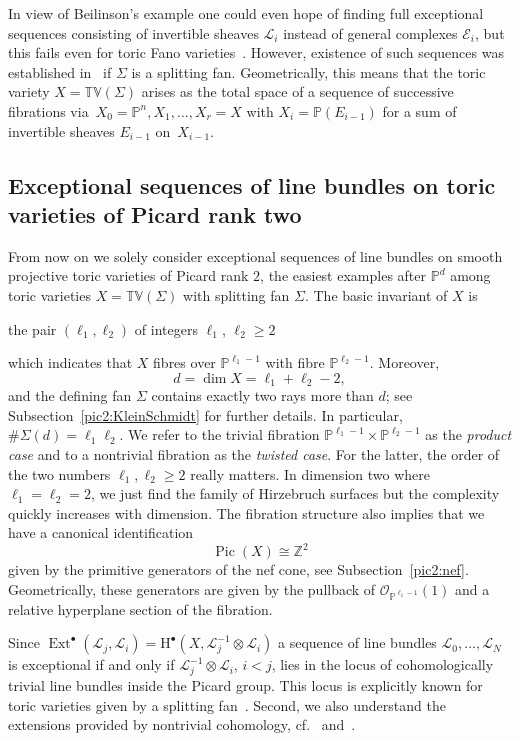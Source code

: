 \documentclass[11pt]{article}
\theoremstyle{definition}
\numberwithin{equation}{section}
\newcommand{\PP}{\mathbb P}
\newcommand{\T}{\mathbb T}
\newcommand{\V}{\mathbb V}
\newcommand{\Z}{\mathbb Z}
\newcommand{\CE}{{\mathcal E}}
\newcommand{\CL}{{\mathcal L}}
\newcommand{\CO}{{\mathcal O}}
\newcommand{\toric}{\T\V}
\newcommand{\Pic}{\operatorname{Pic}}
\newcommand{\gExt}{\operatorname{Ext}}
\newcommand{\kss}{\scriptscriptstyle}
\newcommand{\kbb}{{\kss \bullet}}
\renewcommand{\sharp}{\#}
\newcommand{\ssect}[1]{Subsection~\ref{#1}}
\begin{document}
In view of Beilinson's example one could even 
hope of finding full exceptional sequences 
consisting of invertible sheaves 
$\CL_i$ instead of general complexes $\CE_i$, 
but this fails even for toric Fano 
varieties~\cite{efimov}. However, 
existence of such sequences was established 
in~\cite{CostaMiroRoig} if $\Sigma$ is a 
splitting fan. Geometrically, this means that the 
toric variety $X=\toric(\Sigma)$ arises as the 
total space of a sequence of successive fibrations 
via~$X_0=\PP^n,X_1,\ldots,X_r=X$ with 
$X_i=\PP(E_{i-1})$ for a sum of invertible sheaves 
$E_{i-1}$ on~$X_{i-1}$. 

\subsection{Exceptional sequences of line bundles on 
toric varieties of Picard rank two}
\label{subsec:CoSmToVaPic2}
From now on we solely consider exceptional sequences
of line bundles on smooth projective toric varieties 
of Picard rank $2$, the easiest examples { after 
$\PP^{d}$ among toric varieties $X=\toric(\Sigma)$ 
with splitting fan $\Sigma$.} 
The basic invariant of $X$ is 
\begin{center}
the pair $(\ell_1,\ell_2)$ of integers 
$\ell_1$, $\ell_2\geq2$  
\end{center}
which indicates that $X$ fibres over $\PP^{\ell_1-1}$ 
with fibre $\PP^{\ell_2-1}$. {Moreover,
\[
d=\dim X=\ell_1+\ell_2-2,  
\]
and} the defining fan $\Sigma$ 
contains exactly two rays more than $d$; see 
\ssect{pic2:KleinSchmidt} for further details. 
In particular, $\sharp\Sigma(d)=\ell_1\ell_2$.
We refer to the trivial fibration 
$\PP^{\ell_1-1}\times\PP^{\ell_2-1}$ as the 
{\em product case} and to a nontrivial fibration as 
the {\em twisted case}. For the latter, the order 
of the two numbers $\ell_1,\ell_2\geq 2$ really 
matters. In dimension two where $\ell_1=\ell_2=2$, 
we just find the family of Hirzebruch surfaces
but the complexity quickly increases with dimension. 
{The fibration structure also implies that 
we have a canonical identification 
$$
\Pic(X)\cong\Z^2 
$$
given by the primitive generators of the nef cone, 
see Subsection~\ref{pic2:nef}. Geometrically, 
these generators are given by the pullback of 
$\CO_{\PP^{\ell_1-1}}(1)$ and a relative hyperplane 
section of the fibration.}

Since $\gExt^\kbb(\CL_j,\CL_i)=
\mathrm{H}^\kbb(X,\CL_j^{-1}\otimes\CL_i)$
a sequence of line bundles $\CL_0,\ldots,\CL_N$ 
is exceptional if and only if $\CL_j^{-1}\otimes\CL_i$, 
$i<j$, lies in the locus of cohomologically trivial 
line bundles inside the Picard group. This locus is 
explicitly known for toric varieties given by a splitting 
fan~\cite{immaculate}. Second, we also understand 
the extensions provided by nontrivial cohomology, 
cf.~\cite{dop} and~\cite{displayingExt}.
\end{document}
